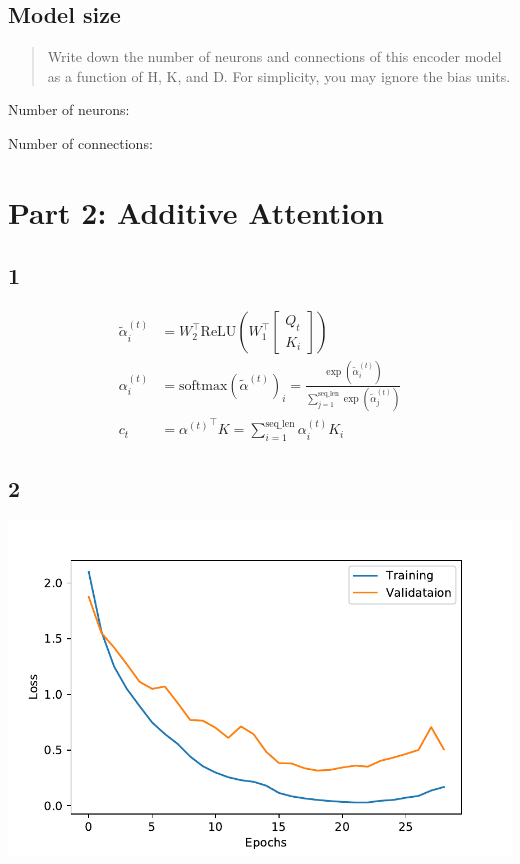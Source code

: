 \documentclass{article}
\begin{document}
\subsection*{Model size}


\begin{quote}
Write down the number of neurons and connections of this encoder model as a function of H, K, and D.  For simplicity, you may ignore the bias units.
\end{quote}

Number of neurons: \todo{}

Number of connections: \todo{}



\section*{Part 2: Additive Attention}

\subsection*{1}

\begin{align*}
\tilde{\alpha}^{(t)}_i &= W_2^\intercal \textrm{ReLU} ( W_1^\intercal 
\begin{bmatrix}
Q_t \\ K_i
\end{bmatrix} 
)
\\
\alpha^{(t)}_i &= \textrm{softmax}(\tilde{\alpha}^{(t)})_i = \frac
{\exp(\tilde{\alpha}^{(t)}_i)}
{\sum_{j=1}^{\textrm{seq\_len}} \exp(\tilde{\alpha}^{(t)}_j) }
\\
c_t &= {\alpha^{(t)}}^\intercal K = \sum_{i=1}^{\textrm{seq\_len}} \alpha^{(t)}_i K_i
\end{align*}

\subsection*{2}
\includegraphics[width=\linewidth]{loss_additive_attention}
\todo{}
\end{document}
